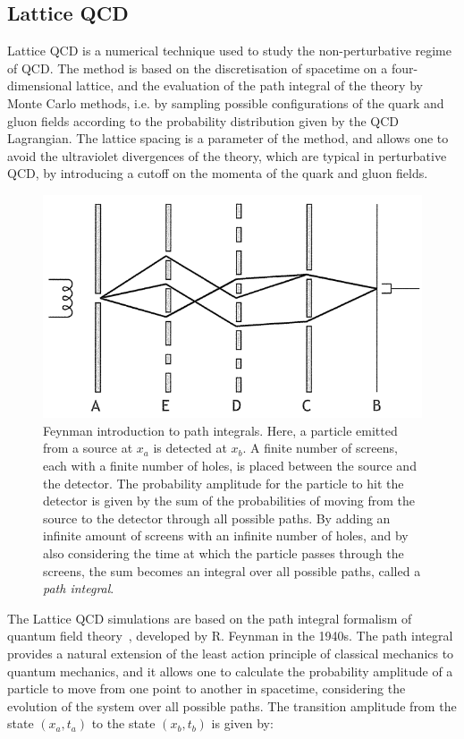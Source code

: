 \subsection{Lattice QCD}
Lattice QCD is a numerical technique used to study the non-perturbative regime of QCD. The method is based on the discretisation of spacetime on a four-dimensional lattice, and the evaluation of the path integral of the theory by Monte Carlo methods, i.e. by sampling possible configurations of the quark and gluon fields according to the probability distribution given by the QCD Lagrangian. The lattice spacing is a parameter of the method, and allows one to avoid the ultraviolet divergences of the theory, which are typical in perturbative QCD, by introducing a cutoff on the momenta of the quark and gluon fields. 
\begin{figure}[htb]
  \centering
  \includegraphics[width=0.7\linewidth]{Figures/Chapter 1/PathIntegrals.png}
  \caption{Feynman introduction to path integrals. Here, a particle emitted from a source at $x_a$ is detected at $x_b$. A finite number of screens, each with a finite number of holes, is placed between the source and the detector. The probability amplitude for the particle to hit the detector is given by the sum of the probabilities of moving from the source to the detector through all possible paths. By adding an infinite amount of screens with an infinite number of holes, and by also considering the time at which the particle passes through the screens, the sum becomes an integral over all possible paths, called a \emph{path integral}.}
  \label{fig:PathIntegrals}
\end{figure}
The Lattice QCD simulations are based on the path integral formalism of quantum field theory~\cite{RevModPhys.20.367}, developed by R. Feynman in the 1940s. The path integral provides a natural extension of the least action principle of classical mechanics to quantum mechanics, and it allows one to calculate the probability amplitude of a particle to move from one point to another in spacetime, considering the evolution of the system over all possible paths. The transition amplitude from the state $(x_a,t_a)$ to the state $(x_b,t_b)$ is given by:
